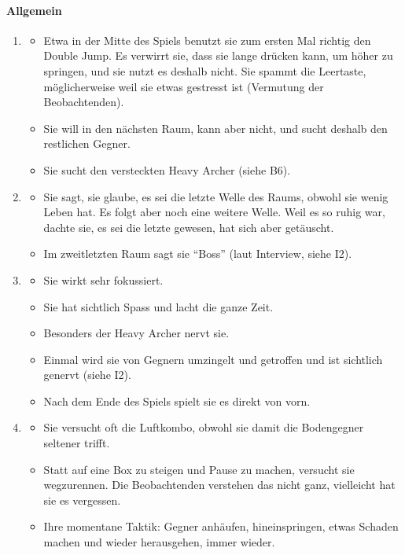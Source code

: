 \documentclass[../Main.tex]{subfiles}
\begin{document}
\paragraph{Allgemein}
\begin{enumerate}[label=\textbf{B\arabic*}, leftmargin=1.5cm, itemsep=0.8em, resume]
\item
\begin{itemize}[nosep]
    \item Etwa in der Mitte des Spiels benutzt sie zum ersten Mal richtig den Double Jump. Es verwirrt sie, dass sie lange drücken kann, um höher zu springen, und sie nutzt es deshalb nicht. Sie spammt die Leertaste, möglicherweise weil sie etwas gestresst ist (Vermutung der Beobachtenden).
    \item Sie will in den nächsten Raum, kann aber nicht, und sucht deshalb den restlichen Gegner.
    \item Sie sucht den versteckten Heavy Archer (siehe B6).
\end{itemize}

\item
\begin{itemize}[nosep]
    \item Sie sagt, sie glaube, es sei die letzte Welle des Raums, obwohl sie wenig Leben hat. Es folgt aber noch eine weitere Welle. Weil es so ruhig war, dachte sie, es sei die letzte gewesen, hat sich aber getäuscht.
    \item Im zweitletzten Raum sagt sie \enquote{Boss} (laut Interview, siehe I2).
\end{itemize}

\item
\begin{itemize}[nosep]
    \item Sie wirkt sehr fokussiert.
    \item Sie hat sichtlich Spass und lacht die ganze Zeit.
    \item Besonders der Heavy Archer nervt sie.
    \item Einmal wird sie von Gegnern umzingelt und getroffen und ist sichtlich genervt (siehe I2).
    \item Nach dem Ende des Spiels spielt sie es direkt von vorn.
\end{itemize}

\item
\begin{itemize}[nosep]
    \item Sie versucht oft die Luftkombo, obwohl sie damit die Bodengegner seltener trifft.
    \item Statt auf eine Box zu steigen und Pause zu machen, versucht sie wegzurennen. Die Beobachtenden verstehen das nicht ganz, vielleicht hat sie es vergessen.
    \item Ihre momentane Taktik: Gegner anhäufen, hineinspringen, etwas Schaden machen und wieder herausgehen, immer wieder.
\end{itemize}


\end{enumerate}
\end{document}

